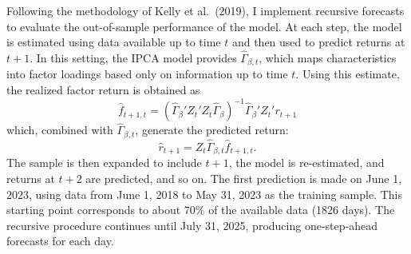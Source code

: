 \documentclass[
  12pt,
  a4paper,
  openany]{scrbook}
\begin{document}
Following the methodology of Kelly et al.~(2019), I implement recursive
forecasts to evaluate the out-of-sample performance of the model. At
each step, the model is estimated using data available up to time \(t\)
and then used to predict returns at \(t+1\). In this setting, the IPCA
model provides \(\hat{\Gamma}_{\beta,t}\), which maps characteristics
into factor loadings based only on information up to time \(t\). Using
this estimate, the realized factor return is obtained as \[
\hat{f}_{t+1,t} = \left( \hat{\Gamma}_\beta' Z_t' Z_t \hat{\Gamma}_\beta \right)^{-1} \hat{\Gamma}_\beta' Z_t' r_{t+1}
\] which, combined with \(\hat{\Gamma}_{\beta,t}\), generate the
predicted return: \[
\hat r_{t+1} = Z_t \hat{\Gamma}_{\beta,t} \hat{f}_{t+1,t}.
\] The sample is then expanded to include \(t+1\), the model is
re-estimated, and returns at \(t+2\) are predicted, and so on. The first
prediction is made on June 1, 2023, using data from June 1, 2018 to May
31, 2023 as the training sample. This starting point corresponds to
about 70\% of the available data (1826 days). The recursive procedure
continues until July 31, 2025, producing one-step-ahead forecasts for
each day.
\end{document}
